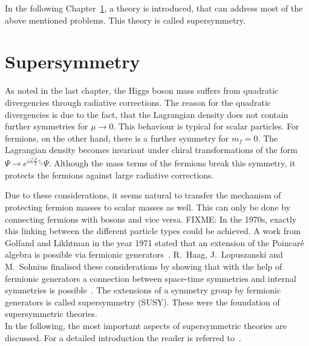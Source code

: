 
In the following Chapter~\ref{ch:Supersymmetry}, a theory is introduced, that can address most of the above mentioned problems.
This theory is called supersymmetry.


\chapter{Supersymmetry}
\label{ch:Supersymmetry}

As noted in the last chapter, the Higgs boson mass suffers from quadratic divergencies through radiative corrections.
The reason for the quadratic divergencies is due to the fact, that the Lagrangian density does not contain further symmetries for $\mu\rightarrow 0 $.
This behaviour is typical for scalar particles.
For fermions, on the other hand, there is a further symmetry for $m_f=0$. 
The Lagrangian density becomes invariant under chiral transformations of the form $\Psi \rightarrow e^{i\vec{\alpha}\frac{\vec{\sigma}}{2} \gamma_5} \Psi$.
Although the mass terms of the fermions break this symmetry, it protects the fermions against large radiative corrections.

Due to these considerations, it seems natural to transfer the mechanism of protecting fermion masses to scalar masses as well.
This can only be done by connecting fermions with bosons and vice versa.
FIXME: In the 1970s, exactly this linking between the different particle types could be achieved.
A work from Golfand and Likhtman in the year 1971 stated that an extension of the Poincar\'e  algebra is possible via fermionic generators~\cite{bib:Golfand_Likhtman_1971}.
R.~Haag, J.~Lopuszanski and M.~Sohnius finalised these considerations by showing that with the help of fermionic generators a connection between space-time symmetries and internal symmetries is possible~\cite{bib:Haag_1974}.
The extensions of a symmetry group by fermionic generators is called supersymmetry (SUSY).
These were the foundation of supersymmetric theories.\\

In the following, the most important aspects of supersymmetric theories are discussed.
For a detailed introduction the reader is referred to~\cite{bib:Drees_1996,bib:Aitchison_2005,bib:Drees_2004}.

